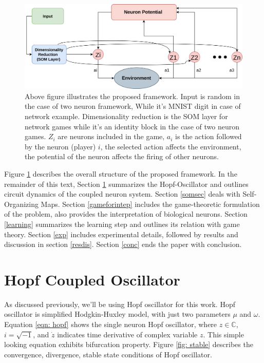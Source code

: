\documentclass{article}
\begin{document}
\begin{figure}
 \centering
 \includegraphics[width=1\textwidth]{overview.png}
 \caption{Above figure illustrates the proposed framework. Input is random in the case of two neuron framework, While it's MNIST digit in case of network example. Dimensionality reduction is the SOM layer for network games while it's an identity block in the case of two neuron games. ${Z_i}$ are neurons included in the game, $a_i$ is the action followed by the neuron (player) $i$, the selected action affects the environment, the potential of the neuron affects the firing of other neurons.}
 \label{fig: overview}
\end{figure}

Figure \ref{fig: overview} describes the overall structure of the proposed framework. In the remainder of this text, Section \ref{hpfosc} summarizes the Hopf-Oscillator and outlines circuit dynamics of the coupled neuron system. Section \ref{somsec} deals with Self-Organizing Maps. Section \ref{gameforintep} includes the game-theoretic formulation of the problem, also provides the interpretation of biological neurons. Section \ref{learning} summarizes the learning step and outlines its relation with game theory. Section \ref{exp} includes experimental details, followed by results and discussion in section \ref{resdis}. Section \ref{conc} ends the paper with conclusion.

\section{Hopf Coupled Oscillator}
\label{hpfosc}

As discussed previously, we'll be using Hopf oscillator for this work. Hopf oscillator is simplified Hodgkin-Huxley model, with just two parameters $\mu$ and $\omega$. Equation \ref{eqn: hopf} shows the single neuron Hopf oscillator, where $z \in \mathbb{C}$, $i = \sqrt{-1}$, and $\dot{z}$ indicates time derivative of complex variable $z$. This simple looking equation exhibits bifurcation property. Figure \ref{fig: stable} describes the convergence, divergence, stable state conditions of Hopf oscillator.
\end{document}
